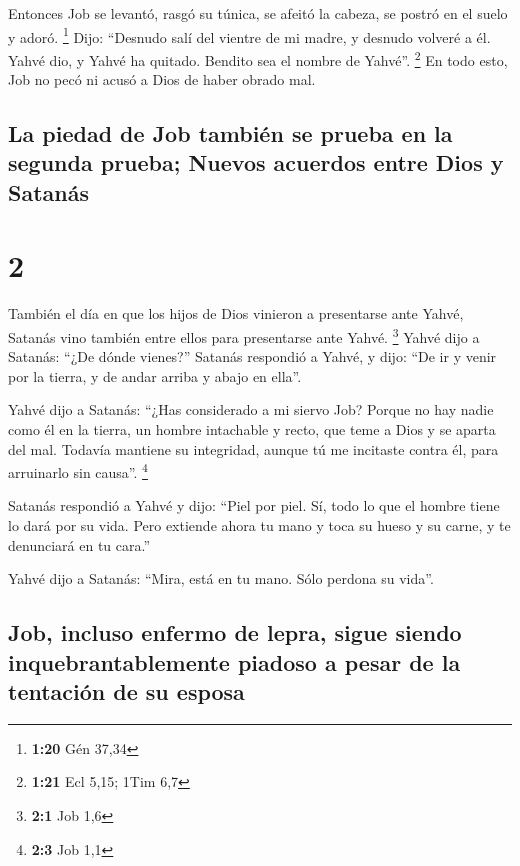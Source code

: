  Entonces Job se levantó, rasgó su túnica, se afeitó la
cabeza, se postró en el suelo y adoró. \footnote{\textbf{1:20} Gén 37,34}
 Dijo: ``Desnudo salí del vientre de mi madre, y desnudo
volveré a él. Yahvé dio, y Yahvé ha quitado. Bendito sea el nombre de
Yahvé''. \footnote{\textbf{1:21} Ecl 5,15; 1Tim 6,7}  En
todo esto, Job no pecó ni acusó a Dios de haber obrado mal.

\hypertarget{la-piedad-de-job-tambiuxe9n-se-prueba-en-la-segunda-prueba-nuevos-acuerdos-entre-dios-y-satanuxe1s}{%
\subsection{La piedad de Job también se prueba en la segunda prueba;
Nuevos acuerdos entre Dios y
Satanás}\label{la-piedad-de-job-tambiuxe9n-se-prueba-en-la-segunda-prueba-nuevos-acuerdos-entre-dios-y-satanuxe1s}}

\hypertarget{section-1}{%
\section{2}\label{section-1}}

 También el día en que los hijos de Dios vinieron a
presentarse ante Yahvé, Satanás vino también entre ellos para
presentarse ante Yahvé. \footnote{\textbf{2:1} Job 1,6} 
Yahvé dijo a Satanás: ``¿De dónde vienes?'' Satanás respondió a Yahvé, y
dijo: ``De ir y venir por la tierra, y de andar arriba y abajo en
ella''.

 Yahvé dijo a Satanás: ``¿Has considerado a mi siervo Job?
Porque no hay nadie como él en la tierra, un hombre intachable y recto,
que teme a Dios y se aparta del mal. Todavía mantiene su integridad,
aunque tú me incitaste contra él, para arruinarlo sin causa''.
\footnote{\textbf{2:3} Job 1,1}

 Satanás respondió a Yahvé y dijo: ``Piel por piel. Sí,
todo lo que el hombre tiene lo dará por su vida.  Pero
extiende ahora tu mano y toca su hueso y su carne, y te denunciará en tu
cara.''

 Yahvé dijo a Satanás: ``Mira, está en tu mano. Sólo
perdona su vida''.

\hypertarget{job-incluso-enfermo-de-lepra-sigue-siendo-inquebrantablemente-piadoso-a-pesar-de-la-tentaciuxf3n-de-su-esposa}{%
\subsection{Job, incluso enfermo de lepra, sigue siendo
inquebrantablemente piadoso a pesar de la tentación de su
esposa}\label{job-incluso-enfermo-de-lepra-sigue-siendo-inquebrantablemente-piadoso-a-pesar-de-la-tentaciuxf3n-de-su-esposa}}

